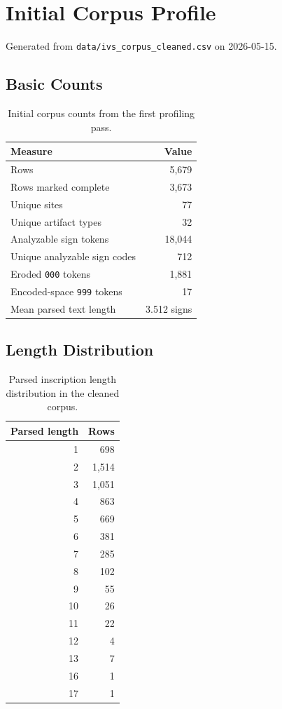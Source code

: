 \section{Initial Corpus Profile}

Generated from \texttt{data/ivs\_corpus\_cleaned.csv} on 2026-05-15.

\subsection{Basic Counts}

\begin{table}[htbp]
\centering
\begin{tabular}{lr}
\toprule
\textbf{Measure} & \textbf{Value} \\
\midrule
Rows & 5,679 \\
Rows marked complete & 3,673 \\
Unique sites & 77 \\
Unique artifact types & 32 \\
Analyzable sign tokens & 18,044 \\
Unique analyzable sign codes & 712 \\
Eroded \texttt{000} tokens & 1,881 \\
Encoded-space \texttt{999} tokens & 17 \\
Mean parsed text length & 3.512 signs \\
\bottomrule
\end{tabular}
\caption{Initial corpus counts from the first profiling pass.}
\label{tab:corpus-counts}
\end{table}

\subsection{Length Distribution}

\begin{table}[htbp]
\centering
\begin{tabular}{rr}
\toprule
\textbf{Parsed length} & \textbf{Rows} \\
\midrule
1 & 698 \\
2 & 1,514 \\
3 & 1,051 \\
4 & 863 \\
5 & 669 \\
6 & 381 \\
7 & 285 \\
8 & 102 \\
9 & 55 \\
10 & 26 \\
11 & 22 \\
12 & 4 \\
13 & 7 \\
16 & 1 \\
17 & 1 \\
\bottomrule
\end{tabular}
\caption{Parsed inscription length distribution in the cleaned corpus.}
\label{tab:length-distribution}
\end{table}

